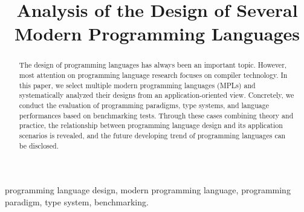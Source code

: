 \documentclass[10pt,conference,letterpaper]{IEEEtran}
\begin{document}
    \title{Analysis of the Design of Several Modern Programming Languages\\
    }

    \author{
    }

    \maketitle

    \begin{abstract}
        The design of programming languages has always been an important topic. However, most attention on programming language research focuses on compiler technology. In this paper, we select multiple modern programming languages (MPLs) and systematically analyzed their designs from an application-oriented view. Concretely, we conduct the evaluation of programming paradigms, type systems, and language performances based on benchmarking tests. Through these cases combining theory and practice, the relationship between programming language design and its application scenarios is revealed, and the future developing trend of programming languages can be disclosed.
    \end{abstract}

    \begin{IEEEkeywords}
        programming language design,
        modern programming language,
        programming paradigm,
        type system,
        benchmarking.
    \end{IEEEkeywords}


    
    
    
    
    
    
\end{document}
